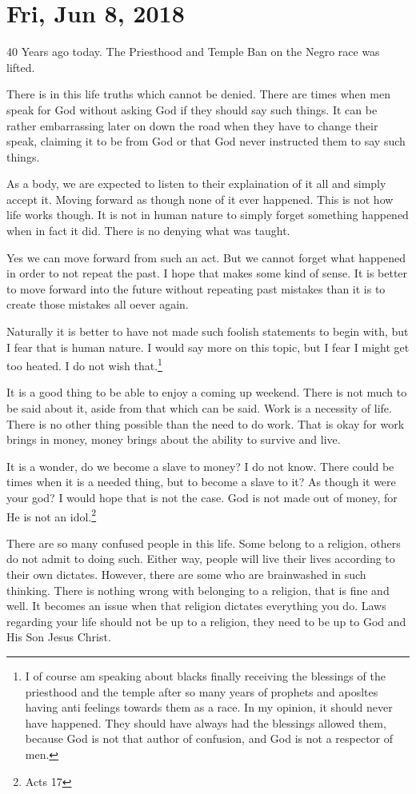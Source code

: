 \section{Fri, Jun 8, 2018}

40 Years ago today. The Priesthood and Temple Ban on the Negro race was lifted.

There is in this life truths which cannot be denied. There are times when men
speak for God without asking God if they should say such things. It can be
rather embarrassing later on down the road when they have to change their speak,
claiming it to be from God or that God never instructed them to say such things.

As a body, we are expected to listen to their explaination of it all and simply
accept it. Moving forward as though none of it ever happened. This is not how
life works though. It is not in human nature to simply forget something happened
when in fact it did. There is no denying what was taught.

Yes we can move forward from such an act. But we cannot forget what happened in
order to not repeat the past. I hope that makes some kind of sense. It is better
to move forward into the future without repeating past mistakes than it is to
create those mistakes all oever again.

Naturally it is better to have not made such foolish statements to begin with,
but I fear that is human nature. I would say more on this topic, but I fear I
might get too heated. I do not wish that.\footnote{I of course am speaking about
blacks finally receiving the blessings of the priesthood and the temple after
so many years of prophets and aposltes having anti feelings towards them as a 
race. In my opinion, it should never have happened. They should have always
had the blessings allowed them, because God is not that author of confusion,
and God is not a respector of men.}

It is a good thing to be able to enjoy a coming up weekend. There is not much to
be said about it, aside from that which can be said. Work is a necessity of
life. There is no other thing possible than the need to do work. That is okay
for work brings in money, money brings about the ability to survive and live.

It is a wonder, do we become a slave to money? I do not know. There could be
times when it is a needed thing, but to become a slave to it? As though it were
your god? I would hope that is not the case. God is not made out of money, for
He is not an idol.\footnote{Acts 17}

There are so many confused people in this life. Some belong to a religion,
others do not admit to doing such. Either way, people will live their lives
according to their own dictates. However, there are some who are brainwashed in
such thinking. There is nothing wrong with belonging to a religion, that is fine
and well. It becomes an issue when that religion dictates everything you do.
Laws regarding your life should not be up to a religion, they need to be up to
God and His Son Jesus Christ.